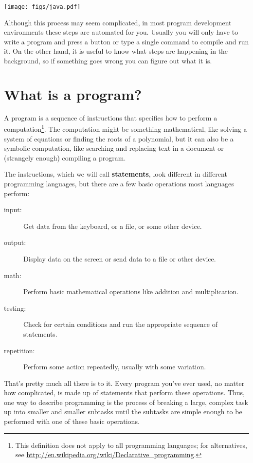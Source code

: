 \documentclass[12pt]{book}
\theoremstyle{definition}
\begin{document}
\texttt{[image: figs/java.pdf]}


Although this process may seem complicated, in most program
development environments these steps
are automated for you.  Usually you will only have to write a program
and press a button or type a single command to compile and run it.  On
the other hand, it is useful to know what steps are
happening in the background, so if something goes wrong you can
figure out what it is.



\section{What is a program?}

A program is a sequence of instructions that specifies how to perform
a computation\footnote{This definition does not apply to all
  programming languages; for alternatives, see
  \url{http://en.wikipedia.org/wiki/Declarative_programming}.}.  The
computation might be something mathematical, like solving a system of
equations or finding the roots of a polynomial, but it can also be a
symbolic computation, like searching and replacing text in a document
or (strangely enough) compiling a program.


The instructions, which we will call {\bf statements}, look different
in different programming languages, but there are a few basic
operations most languages perform:

\begin{description}

\item[input:] Get data from the keyboard, or a file, or some
other device.

\item[output:] Display data on the screen or send data to a
file or other device.

\item[math:] Perform basic mathematical operations like addition and
multiplication.

\item[testing:] Check for certain conditions and run the
appropriate sequence of statements.

\item[repetition:] Perform some action repeatedly, usually with
some variation.

\end{description}

That's pretty much all there is to it.
Every program you've ever used, no matter how complicated, is
made up of statements that perform these operations.  Thus,
one way to describe programming is the process of breaking a
large, complex task up into smaller and smaller subtasks
until the subtasks are simple enough to be performed
with one of these basic operations.
\end{document}
